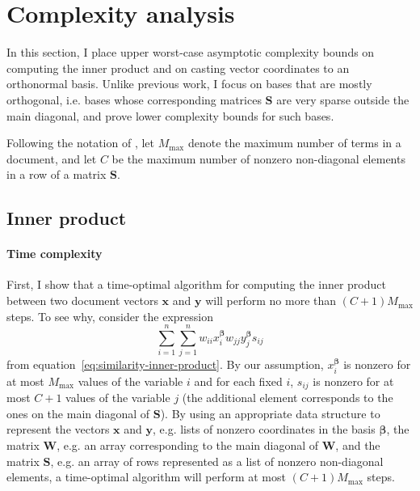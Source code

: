 \documentclass[
  digital, %
  notable, %
  lof,     %
  lot,     %
  nopalatino, color
]{fithesis3}
\begin{document}
\section{Complexity analysis}
\label{sec:similarity-complexity}
In this section, I place upper worst-case asymptotic complexity bounds on
computing the inner product and on casting vector coordinates to an orthonormal
basis. Unlike previous work, I focus on bases that are mostly orthogonal,
i.e. bases whose corresponding matrices $\mathbf S$ are very
sparse outside the main diagonal, and prove lower complexity bounds for such
bases.

Following the notation of \textcite{ml:IntroIR2008}, let
$M_{\max}$ denote the maximum number of terms in a document,
and let $C$ be the maximum number of nonzero non-diagonal
elements in a row of a matrix $\mathbf S$.

\subsection{Inner product}
\paragraph{Time complexity} First, I show that a time-optimal algorithm
for computing the inner product between two document vectors $\mathbf x$ and
$\mathbf y$ will perform no more than $(C+1)M_{\max}$ steps. To see why,
consider the expression\begin{equation*}
  \sum_{i=1}^n\sum_{j=1}^nw_{ii}x_i^{\bm\beta}w_{jj}y_j^{\bm\beta}
  s_{ij}
\end{equation*} from equation~\ref{eq:similarity-inner-product}. By our
assumption, $x_i^{\bm\beta}$ is nonzero for at most $M_{\max}$ values
of the variable $i$ and for each fixed $i$, $s_{ij}$ is nonzero for at most
$C+1$ values of the variable $j$ (the additional element corresponds to the
ones on the main diagonal of $\mathbf S$). By using an
appropriate data structure to represent the vectors $\mathbf x$ and $\mathbf
y$, e.g. lists of nonzero coordinates in the basis $\bm\beta$, the matrix
$\mathbf W$, e.g. an array corresponding to the main
diagonal of $\mathbf W$, and the matrix $\mathbf
S$, e.g. an array of rows represented as a list of nonzero
non-diagonal elements, a time-optimal algorithm will perform at most
$(C+1)M_{\max}$ steps.
\end{document}
